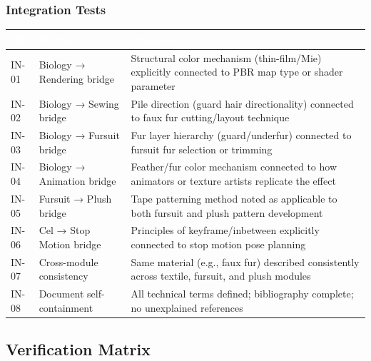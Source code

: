 \documentclass[11pt,letterpaper]{article}
\newcommand{\tableheader}[1]{\textbf{\sffamily\textcolor{white}{#1}}}
\begin{document}
\subsubsection{Integration Tests}

\begin{center}
\begin{tabularx}{\textwidth}{C{1.5cm}L{4cm}X}
\toprule
{}
\tableheader{ID} & \tableheader{Verifies} & \tableheader{Expected} \\
\midrule
IN-01 & Biology → Rendering bridge & Structural color mechanism (thin-film/Mie) explicitly connected to PBR map type or shader parameter \\
IN-02 & Biology → Sewing bridge & Pile direction (guard hair directionality) connected to faux fur cutting/layout technique \\
IN-03 & Biology → Fursuit bridge & Fur layer hierarchy (guard/underfur) connected to fursuit fur selection or trimming \\
IN-04 & Biology → Animation bridge & Feather/fur color mechanism connected to how animators or texture artists replicate the effect \\
IN-05 & Fursuit → Plush bridge & Tape patterning method noted as applicable to both fursuit and plush pattern development \\
IN-06 & Cel → Stop Motion bridge & Principles of keyframe/inbetween explicitly connected to stop motion pose planning \\
IN-07 & Cross-module consistency & Same material (e.g., faux fur) described consistently across textile, fursuit, and plush modules \\
IN-08 & Document self-containment & All technical terms defined; bibliography complete; no unexplained references \\
\bottomrule
\end{tabularx}
\end{center}

\subsection{Verification Matrix}
\end{document}
